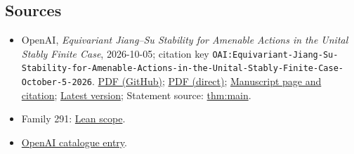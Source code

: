 \documentclass[11pt]{article}
\begin{document}
\subsection{Sources}
\begin{itemize}
\item OpenAI, \emph{Equivariant Jiang–Su Stability for Amenable Actions in the Unital Stably Finite Case}, 2026-10-05; citation key \texttt{OAI:Equivariant-Jiang-Su-Stability-for-Amenable-Actions-in-the-Unital-Stably-Finite-Case-October-5-2026}. \href{https://github.com/openai/math/blob/adc7f1241b42e322a6451854ab7e4b4c146bf78a/preprints/Equivariant-Jiang-Su-Stability-for-Amenable-Actions-in-the-Unital-Stably-Finite-Case-October-5-2026/paper.pdf}{PDF (GitHub)}; \href{https://github.com/openai/math/raw/adc7f1241b42e322a6451854ab7e4b4c146bf78a/preprints/Equivariant-Jiang-Su-Stability-for-Amenable-Actions-in-the-Unital-Stably-Finite-Case-October-5-2026/paper.pdf}{PDF (direct)}; \href{https://github.com/openai/math/blob/adc7f1241b42e322a6451854ab7e4b4c146bf78a/preprints/Equivariant-Jiang-Su-Stability-for-Amenable-Actions-in-the-Unital-Stably-Finite-Case-October-5-2026/README.md}{Manuscript page and citation}; \href{https://github.com/openai/math/blob/main/preprints/Equivariant-Jiang-Su-Stability-for-Amenable-Actions-in-the-Unital-Stably-Finite-Case-October-5-2026/paper.pdf}{Latest version}; Statement source: \href{https://github.com/openai/math/blob/adc7f1241b42e322a6451854ab7e4b4c146bf78a/preprints/Equivariant-Jiang-Su-Stability-for-Amenable-Actions-in-the-Unital-Stably-Finite-Case-October-5-2026/build/sections/introduction.tex\#L10}{thm:main}.
\item Family 291: \href{https://github.com/openai/math/blob/adc7f1241b42e322a6451854ab7e4b4c146bf78a/lean/docs/291.md}{Lean scope}.
\item \href{https://github.com/openai/math/blob/adc7f1241b42e322a6451854ab7e4b4c146bf78a/CONTENTS.md}{OpenAI catalogue entry}.
\end{itemize}
\end{document}
